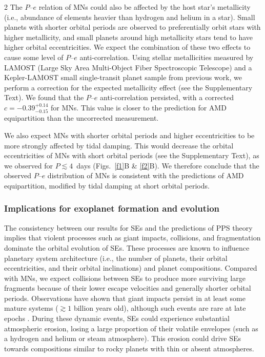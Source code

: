 \documentclass[10pt]{article}
\begin{document}
\begin{multicols}{2}
The $P$--$e$ relation of MNs could also be affected by the host star’s metallicity (i.e., abundance of elements heavier than hydrogen and helium in a star).
Small planets with shorter orbital periods are observed to preferentially orbit stars with higher metallicity\cite{2016AJ....152..187M}, and small planets around high metallicity stars tend to have higher orbital eccentricities\cite{2023AJ....165..125A}.
We expect the combination of these two effects to cause some level of $P$--$e$ anti-correlation.
Using stellar metallicities measured by LAMOST (Large Sky Area Multi-Object Fiber Spectroscopic Telescope)\cite{2012RAA....12.1197C} and a Kepler-LAMOST small single-transit planet sample from previous work\cite{2023AJ....165..125A}, we perform a correction for the expected metallicity effect (see the Supplementary Text).
We found that the $P$--$e$ anti-correlation persisted, with a corrected $c=-0.39^{+0.14}_{-0.15}$ for MNs.
This value is closer to the prediction for AMD equipartition than the uncorrected measurement.

We also expect MNs with shorter orbital periods and higher eccentricities to be more strongly affected by tidal damping.
This would decrease the orbital eccentricities of MNs with short orbital periods (see the Supplementary Text), as we observed for $P\lesssim4$~days (Figs.~\ref{f1}B \& \ref{f2}B).
We therefore conclude that the observed $P$--$e$ distribution of MNs is consistent with the predictions of AMD equipartition, modified by tidal damping at short orbital periods.

\subsubsection*{Implications for exoplanet formation and evolution}
\noindent The consistency between our results for SEs and the predictions of PPS theory implies that violent processes such as giant impacts, collisions, and fragmentation dominate the orbital evolution of SEs.
These processes are known to influence planetary system architecture (i.e., the number of planets, their orbital eccentricities, and their orbital inclinations) and planet compositions\cite{2016ApJ...822...54D,2017AJ....154...27M}.
Compared with MNs, we expect collisions between SEs to produce more surviving large fragments because of their lower escape velocities and generally shorter orbital periods.
Observations have shown that giant impacts persist in at least some mature systems ($\gtrsim 1$ billion years old), although such events are rare at late epochs \cite{2015ApJ...805...77M}.
During these dynamic events, SEs could experience substantial atmospheric erosion, losing a large proportion of their volatile envelopes (such as a hydrogen and helium or steam atmosphere).
This erosion could drive SEs towards compositions similar to rocky planets with thin or absent atmospheres\cite{2015ApJ...812..164L,2015Icar..247...81S,2024ApJ...967...38Z}.


\end{multicols}
\end{document}
